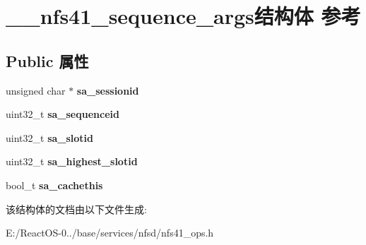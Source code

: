 \hypertarget{struct____nfs41__sequence__args}{}\section{\+\_\+\+\_\+nfs41\+\_\+sequence\+\_\+args结构体 参考}
\label{struct____nfs41__sequence__args}
\subsection*{Public 属性}
\begin{DoxyCompactItemize}
\item 
\mbox{\label{struct____nfs41__sequence__args_a8847941ae03a82e7d2830bc59259f451}} 
unsigned char $\ast$ {\bfseries sa\+\_\+sessionid}
\item 
\mbox{\label{struct____nfs41__sequence__args_a2e05258bdfcbe29f30147db569b149ba}} 
uint32\+\_\+t {\bfseries sa\+\_\+sequenceid}
\item 
\mbox{\label{struct____nfs41__sequence__args_a7576c430af0b26422a3e78f43cf47145}} 
uint32\+\_\+t {\bfseries sa\+\_\+slotid}
\item 
\mbox{\label{struct____nfs41__sequence__args_af2aa4e133ad92d72bcf7a9ecddb71a0d}} 
uint32\+\_\+t {\bfseries sa\+\_\+highest\+\_\+slotid}
\item 
\mbox{\label{struct____nfs41__sequence__args_a6ed0078552f732a18369b8bfcaff5457}} 
bool\+\_\+t {\bfseries sa\+\_\+cachethis}
\end{DoxyCompactItemize}


该结构体的文档由以下文件生成\+:\begin{DoxyCompactItemize}
\item 
E\+:/\+React\+O\+S-\/0../base/services/nfsd/nfs41\+\_\+ops.\+h\end{DoxyCompactItemize}
